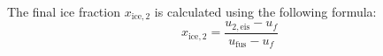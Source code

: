 The final ice fraction \( x_{\text{ice},2} \) is calculated using the following formula:  
\[
x_{\text{ice},2} = \frac{u_{2,\text{eis}} - u_f}{u_{\text{fus}} - u_f}
\]